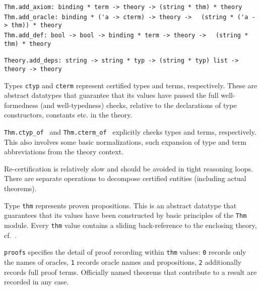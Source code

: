 \begin{isabellebody}
\begin{isamarkuptext}
\begin{mldecls}
  \verb|Thm.add_axiom: binding * term -> theory -> (string * thm) * theory| \\
  \verb|Thm.add_oracle: binding * ('a -> cterm) -> theory ->|\isasep\isanewline%
\verb|  (string * ('a -> thm)) * theory| \\
  \verb|Thm.add_def: bool -> bool -> binding * term -> theory ->|\isasep\isanewline%
\verb|  (string * thm) * theory| \\
  \end{mldecls}
  \begin{mldecls}
  \verb|Theory.add_deps: string -> string * typ -> (string * typ) list ->|\isasep\isanewline%
\verb|  theory -> theory| \\
  \end{mldecls}

  \begin{description}

  \item Types \verb|ctyp| and \verb|cterm| represent certified
  types and terms, respectively.  These are abstract datatypes that
  guarantee that its values have passed the full well-formedness (and
  well-typedness) checks, relative to the declarations of type
  constructors, constants etc. in the theory.

  \item \verb|Thm.ctyp_of|~ and \verb|Thm.cterm_of|~ explicitly checks types and terms,
  respectively.  This also involves some basic normalizations, such
  expansion of type and term abbreviations from the theory context.

  Re-certification is relatively slow and should be avoided in tight
  reasoning loops.  There are separate operations to decompose
  certified entities (including actual theorems).

  \item Type \verb|thm| represents proven propositions.  This is
  an abstract datatype that guarantees that its values have been
  constructed by basic principles of the \verb|Thm| module.
  Every \verb|thm| value contains a sliding back-reference to the
  enclosing theory, cf.\ .

  \item \verb|proofs| specifies the detail of proof recording within
  \verb|thm| values: \verb|0| records only the names of oracles,
  \verb|1| records oracle names and propositions, \verb|2| additionally
  records full proof terms.  Officially named theorems that contribute
  to a result are recorded in any case.


\end{description}
\end{isamarkuptext}
\end{isabellebody}
